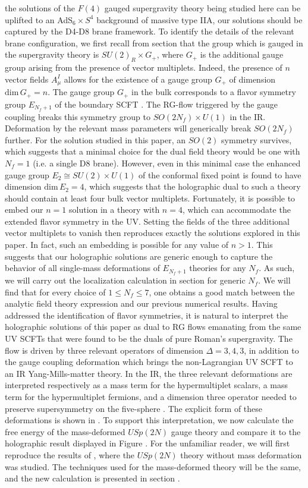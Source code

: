 \documentclass[12pt]{article}
\begin{document}
the solutions of the $F(4)$ gauged supergravity theory being studied here can be uplifted to an AdS$_6 \times S^4$ background of massive type IIA, our solutions should be captured by the D4-D8 brane framework. To identify the details of the relevant brane configuration, we first recall from section  that the group which is gauged in the supergravity theory is $SU(2)_R \times G_+$, where $G_+$ is the additional gauge group arising from the presence of vector multiplets. Indeed, the presence of $n$ vector fields $A_\mu^I$ allows for the existence of a gauge group $G_+$ of dimension $\mathrm{dim} \,G_+ = n$. The gauge group $G_+$ in the bulk corresponds to a flavor symmetry group $E_{N_f+1}$ of the boundary SCFT . The RG-flow triggered by the gauge coupling breaks this symmetry group to $SO(2N_f)\times U(1)$ in the IR. Deformation by the relevant mass parameters will generically break $SO(2N_f)$ further. For the solution  studied in this paper, an $SO(2)$ symmetry survives, which suggests that a minimal choice for the dual field theory would be one with $N_f=1$ (i.e. a single D8 brane).
However, even in this minimal case the enhanced gauge group $E_2 \cong SU(2) \times U(1)$ of the conformal fixed point is found to have dimension $\mathrm{dim}\, E_2=4$, which suggests that the holographic dual to such a theory should contain at least four bulk vector multiplets. Fortunately, it is possible to embed our $n=1$ solution in a theory with $n=4$, which can accommodate the extended flavor symmetry in the UV. Setting the fields of the three additional vector multiplets to vanish then reproduces exactly the solutions explored in this paper. In fact, such an embedding is possible for any value of $n>1$. This suggests that our holographic solutions are generic enough to capture the behavior of all single-mass deformations of $E_{N_f+1}$ theories for any $N_f$. As such, we will carry out the localization calculation in section  for generic $N_f$. We will find that for every choice of $1 \leq N_f \leq7$, one obtains a good match between the analytic field theory expression and our previous numerical results.
Having addressed the identification of flavor symmetries, it is natural to interpret the holographic solutions of this paper as dual to RG flows emanating from the same UV SCFTs that were found to be the duals of pure Roman's supergravity.  The flow is driven by three relevant operators of dimension $\Delta = 3,4,3$, in addition to the gauge coupling deformation which brings the non-Lagrangian UV SCFT to an IR Yang-Mills-matter theory. In the IR, the three relevant deformations are interpreted respectively as a mass term for the hypermultiplet scalars, a mass term for the hypermultiplet fermions, and a dimension three operator needed to preserve supersymmetry on the five-sphere . The explicit form of these deformations is shown in .  
To support this interpretation, we now calculate the free energy of the mass-deformed $USp(2N)$ gauge theory and compare it to the holographic result displayed in Figure . For the unfamiliar reader, we will first reproduce the results of , where the $USp(2N)$ theory without mass deformation was studied. The techniques used for the mass-deformed theory will be the same, and the new calculation is presented in section .
\end{document}
